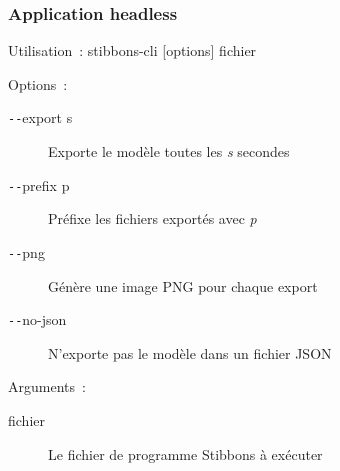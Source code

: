\begin{frame}
\frametitle{Application headless}

Utilisation~: stibbons-cli [options] fichier

Options~:
\begin{description}
	\item[\texttt{-{}-}export s] Exporte le modèle toutes les \emph{s} secondes
	\item[\texttt{-{}-}prefix p] Préfixe les fichiers exportés avec \emph{p}
	\item[\texttt{-{}-}png] Génère une image PNG pour chaque export
	\item[\texttt{-{}-}no-json] N'exporte pas le modèle dans un fichier JSON
\end{description}

Arguments~:
\begin{description}
	\item[fichier] Le fichier de programme Stibbons à exécuter
\end{description}

\end{frame}

